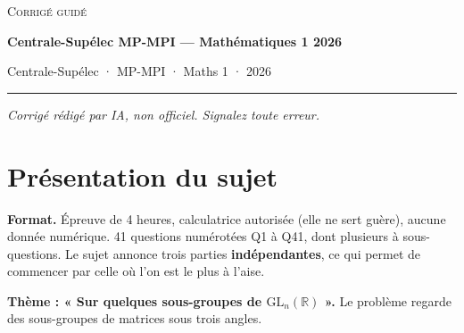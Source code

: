 \documentclass[11pt,a4paper]{article}
\begin{document}
\thispagestyle{plain}
\begin{center}
  {\small\scshape Corrigé guidé}\par\smallskip
  {\LARGE\bfseries Centrale-Supélec MP-MPI — Mathématiques 1 2026\par}\medskip
  {\large Centrale-Supélec · MP-MPI · Maths 1 · 2026\par}
\end{center}
\vspace{2pt}\hrule\vspace{8pt}

\emph{Corrigé rédigé par IA, non officiel. Signalez toute erreur.}

\hypertarget{pruxe9sentation-du-sujet}{%
\section{Présentation du sujet}\label{pruxe9sentation-du-sujet}}

\textbf{Format.} Épreuve de 4 heures, calculatrice autorisée (elle ne sert guère), aucune donnée numérique. 41 questions numérotées Q1 à Q41, dont plusieurs à sous-questions. Le sujet annonce trois parties \textbf{indépendantes}, ce qui permet de commencer par celle où l'on est le plus à l'aise.

\textbf{Thème : « Sur quelques sous-groupes de \({\mathrm{GL}}_n(\mathbb{R})\) ».} Le problème regarde des sous-groupes de matrices sous trois angles.
\end{document}
